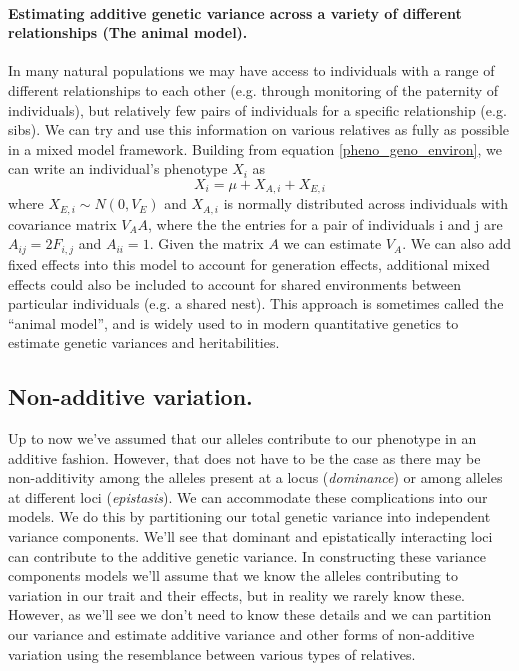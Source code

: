 \paragraph{Estimating additive genetic variance across a variety of
  different relationships (The animal model).}

In many natural populations we may have access to individuals with a
range of different relationships to each other (e.g. through monitoring
of the paternity of individuals), but relatively few pairs of individuals for a specific relationship (e.g. sibs). We can try and use this information on various relatives as
fully as possible in a mixed model framework. Building from equation
\ref{pheno_geno_environ}, we can write an individual's phenotype $X_i$
 as 
\begin{equation}
X_i =  \mu  + X_{A,i} + X_{E,i} 
\end{equation}
where $X_{E,i} \sim N(0,V_E)$  and $X_{A,i}$ is normally distributed across
individuals with covariance matrix $V_A A$, where the the entries for
a pair of individuals i and j are 
$A_{ij}= 2 F_{i,j}$ and $A_{ii}= 1$. Given the matrix $A$ we can estimate $V_A$. We can
also add fixed effects into this model to account for generation
effects, additional mixed effects could also be included to account
for shared environments between particular individuals (e.g. a shared nest).
This approach is sometimes called the ``animal model'', and is widely
used to in modern quantitative genetics to estimate genetic variances and heritabilities. 


\subsection{Non-additive variation.}
\label{section:nonAddVar}
Up to now we've assumed that our alleles contribute to our phenotype in an
additive fashion. However, that does not have to be the case as there may be
non-additivity among the alleles present at a locus (\emph{dominance}) or among
alleles at different loci (\emph{epistasis}). We can accommodate these complications
into our models. We do this by partitioning our total genetic variance into
independent variance components. We'll see that dominant and
epistatically interacting loci can contribute to the additive genetic
variance. In constructing these variance components models we'll
assume that we know the alleles contributing to variation in our trait and their
effects, but in reality we rarely know these. However, as we'll see we
don't need to know these details and we can partition our variance and
estimate additive variance and other forms of non-additive variation
using the resemblance between various types of relatives.


